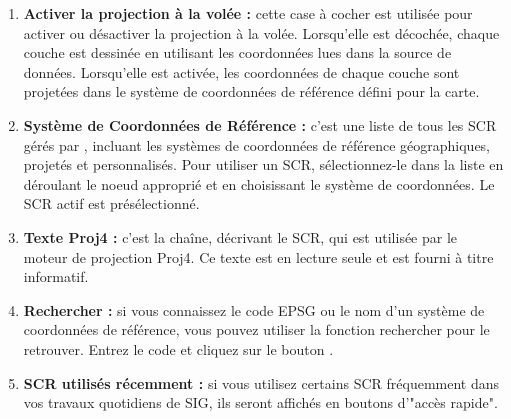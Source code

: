 \begin{enumerate}
\item \textbf{Activer la projection à la volée :} 
cette case à cocher est utilisée pour activer ou désactiver la projection à la
volée. Lorsqu'elle est décochée, chaque couche est dessinée en utilisant les
coordonnées lues dans la source de données. Lorsqu'elle est activée, les
coordonnées de chaque couche sont projetées dans le système de coordonnées de
référence défini pour la carte.
\item \textbf{Système de Coordonnées de Référence :} c'est une liste de tous
les SCR gérés par \qg, incluant les systèmes de coordonnées de référence 
géographiques, projetés et personnalisés. Pour utiliser un SCR, sélectionnez-le 
dans la liste en déroulant le noeud approprié et en choisissant le système de
coordonnées. Le SCR actif est présélectionné.
\item \textbf{Texte Proj4 :} c'est la chaîne, décrivant le SCR, qui est utilisée 
par le moteur de projection Proj4. Ce texte est en lecture seule et est fourni 
à titre informatif.
\item \textbf{Rechercher :} si vous connaissez le code EPSG ou le nom d'un
système de coordonnées de référence, vous pouvez utiliser la fonction
rechercher pour le retrouver. Entrez le code et cliquez sur le bouton
.
\item \textbf{SCR utilisés récemment :} si vous utilisez certains SCR fréquemment 
dans vos travaux quotidiens de SIG, ils seront affichés en boutons d'"accès rapide".
\end{enumerate}

